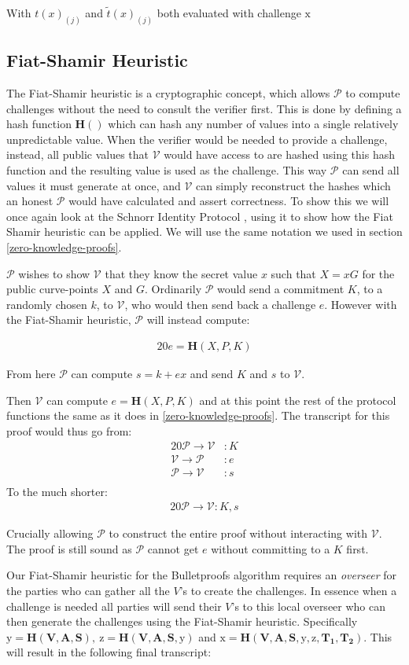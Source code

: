 \documentclass{article}
\newcommand{\eq}[1]{\begin{alignat*}{20}#1\end{alignat*}}
\renewcommand{\vec}[1]{\boldsymbol{#1}}
\newcommand{\ran}[1]{\mathrm{#1}}
\newcommand{\V}{\mathcal{V}}
\renewcommand{\P}{\mathcal{P}}
\newcommand{\blind}[1]{\widetilde{#1}}
\newcommand{\bt}{\blind{t}}
\begin{document}
With $t(x)_{(j)}$ and $\bt(x)_{(j)}$ both evaluated with challenge $\ran{x}$

\subsection{Fiat-Shamir Heuristic}\label{fiat-shamir-heuristic}

The Fiat-Shamir heuristic \cite{zkdocs-fiat-shamir} is a cryptographic concept, which allows
$\P$ to compute challenges without the need to consult the verifier
first. This is done by defining a hash function $\textbf{H}()$ which
can hash any number of values into a single relatively unpredictable
value. When the verifier would be needed to provide a challenge,
instead, all public values that $\V$ would have access to are
hashed using this hash function and the resulting value is used as
the challenge. This way $\P$ can send all values it must generate at
once, and $\V$ can simply reconstruct the hashes which an honest $\P$
would have calculated and assert correctness. To show this we will
once again look at the Schnorr Identity Protocol \cite{zkdocs-schnorr}, using it to show
how the Fiat Shamir heuristic can be applied. We will use the same
notation we used in section \ref{zero-knowledge-proofs}.

$\P$ wishes to show $\V$ that they know the secret value $x$ such that
$X = xG$ for the public curve-points $X$ and $G$. Ordinarily $\P$ would
send a commitment $K$, to a randomly chosen $k$, to $\V$, who would
then send back a challenge $e$. However with the Fiat-Shamir heuristic,
$\P$ will instead compute:

\eq{
	e = \textbf{H}(X,P,K)
}

From here $\P$ can compute $s = k + ex$ and send $K$ and $s$ to $\V$.

Then $\V$ can compute $e = \textbf{H}(X,P,K)$ and at this
point the rest of the protocol functions the same as it does in
\ref{zero-knowledge-proofs}. The transcript for this proof would thus go from:
\eq{
	\P \rightarrow \V &: K \\
	\V \rightarrow \P &: e \\
	\P \rightarrow \V &: s \\
}
To the much shorter:
\eq{
	\P \rightarrow \V: K, s
}

Crucially allowing $\P$ to construct the entire proof without
interacting with $\V$. The proof is still sound as $\P$ cannot get $e$
without committing to a $K$ first.

Our Fiat-Shamir heuristic for the Bulletproofs algorithm requires
an \textit{overseer} for the parties who can gather all the $V$'s
to create the challenges. In essence when a challenge is needed all
parties will send their $V$'s to this local overseer who can then
generate the challenges using the Fiat-Shamir heuristic. Specifically
$\ran{y} = \textbf{H}(\vec{V},\vec{A},\vec{S}), \ \ran{z} =
\textbf{H}(\vec{V},\vec{A},\vec{S}, \ran{y})$ and $\ran{x}
= \textbf{H}(\vec{V},\vec{A},\vec{S}, \ran{y}, \ran{z},
\vec{T_1},\vec{T_2})$. This will result in the following final
transcript:
\end{document}
